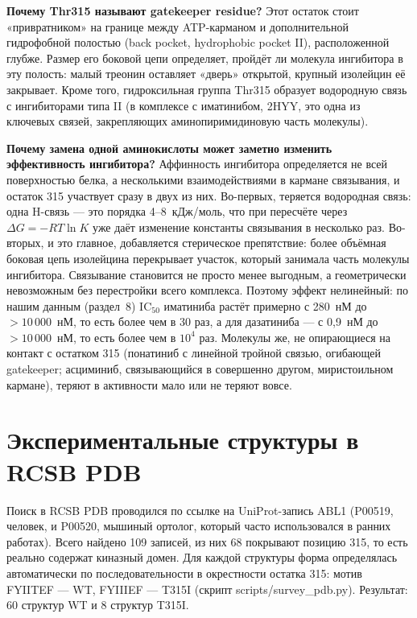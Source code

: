 \documentclass[12pt,a4paper]{article}
\newcommand{\code}[1]{{\ttfamily #1}}
\begin{document}
\medskip
\noindent\textbf{Почему Thr315 называют gatekeeper residue?}
Этот остаток стоит «привратником» на границе между ATP-карманом и дополнительной
гидрофобной полостью (back pocket, hydrophobic pocket II), расположенной глубже.
Размер его боковой цепи определяет, пройдёт ли молекула ингибитора в эту полость:
малый треонин оставляет «дверь» открытой, крупный изолейцин её закрывает. Кроме того,
гидроксильная группа Thr315 образует водородную связь с ингибиторами типа II
(в комплексе с иматинибом, \code{2HYY}, это одна из ключевых связей, закрепляющих
аминопиримидиновую часть молекулы).

\medskip
\noindent\textbf{Почему замена одной аминокислоты может заметно изменить эффективность
ингибитора?}
Аффинность ингибитора определяется не всей поверхностью белка, а несколькими
взаимодействиями в кармане связывания, и остаток 315 участвует сразу в двух из них.
Во-первых, теряется водородная связь: одна H-связь --- это порядка 4--8~кДж/моль, что
при пересчёте через $\Delta G = -RT\ln K$ уже даёт изменение константы связывания в
несколько раз. Во-вторых, и это главное, добавляется стерическое препятствие: более
объёмная боковая цепь изолейцина перекрывает участок, который занимала часть молекулы
ингибитора. Связывание становится не просто менее выгодным, а геометрически
невозможным без перестройки всего комплекса. Поэтому эффект нелинейный: по нашим
данным (раздел~8) IC$_{50}$ иматиниба растёт примерно с 280~нМ до $>10\,000$~нМ, то
есть более чем в 30 раз, а для дазатиниба --- с 0{,}9~нМ до $>10\,000$~нМ, то есть
более чем в $10^4$ раз. Молекулы же, не опирающиеся на контакт с остатком 315
(понатиниб с линейной тройной связью, огибающей gatekeeper; асциминиб, связывающийся
в совершенно другом, миристоильном кармане), теряют в активности мало или не теряют
вовсе.

\section{Экспериментальные структуры в RCSB PDB}

Поиск в RCSB PDB проводился по ссылке на UniProt-запись ABL1 (\code{P00519},
человек, и \code{P00520}, мышиный ортолог, который часто использовался в ранних
работах). Всего найдено 109 записей, из них 68 покрывают позицию 315, то есть реально
содержат киназный домен. Для каждой структуры форма определялась автоматически по
последовательности в окрестности остатка 315: мотив \code{FYIITEF} --- WT, \code{FYIIIEF} ---
T315I (скрипт \code{scripts/survey\_pdb.py}). Результат: 60 структур WT и 8 структур
T315I.
\end{document}
